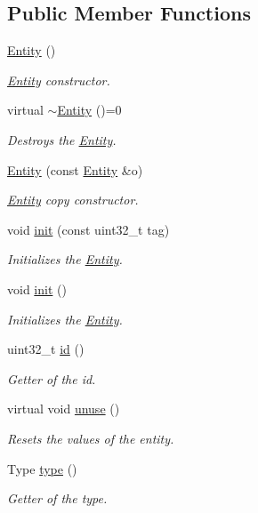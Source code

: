 \subsection*{Public Member Functions}
\begin{DoxyCompactItemize}
\item 
\hyperlink{class_entity_a980f368aa07ce358583982821533a54a}{Entity} ()
\begin{DoxyCompactList}\small\item\em \hyperlink{class_entity}{Entity} constructor. \end{DoxyCompactList}\item 
virtual \hyperlink{class_entity_a6216319e71da21b7708bbfeb537c4d0f}{$\sim$\+Entity} ()=0
\begin{DoxyCompactList}\small\item\em Destroys the \hyperlink{class_entity}{Entity}. \end{DoxyCompactList}\item 
\hyperlink{class_entity_ad758dc48d715e48ada4193517f1d32ea}{Entity} (const \hyperlink{class_entity}{Entity} \&o)
\begin{DoxyCompactList}\small\item\em \hyperlink{class_entity}{Entity} copy constructor. \end{DoxyCompactList}\item 
void \hyperlink{class_entity_a085fa2dd2c2b1f3f60d601a68d5c6773}{init} (const uint32\+\_\+t tag)
\begin{DoxyCompactList}\small\item\em Initializes the \hyperlink{class_entity}{Entity}. \end{DoxyCompactList}\item 
void \hyperlink{class_entity_a93bfb0b92c06297c207fad4164810fed}{init} ()
\begin{DoxyCompactList}\small\item\em Initializes the \hyperlink{class_entity}{Entity}. \end{DoxyCompactList}\item 
uint32\+\_\+t \hyperlink{class_entity_ae4a75e659a4426f57f5c1d44f1b8ef34}{id} ()
\begin{DoxyCompactList}\small\item\em Getter of the id. \end{DoxyCompactList}\item 
virtual void \hyperlink{class_entity_a7b87e24b0d790b2c182fad8aa572455c}{unuse} ()
\begin{DoxyCompactList}\small\item\em Resets the values of the entity. \end{DoxyCompactList}\item 
Type \hyperlink{class_entity_a57c1ccf94325b1b771f4656178ab2b81}{type} ()
\begin{DoxyCompactList}\small\item\em Getter of the type. \end{DoxyCompactList}\end{DoxyCompactItemize}
